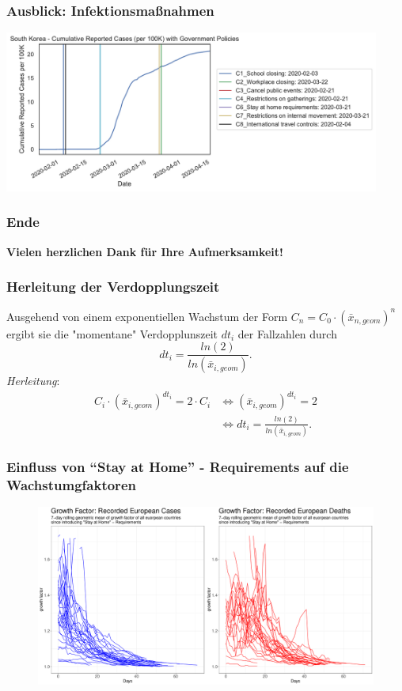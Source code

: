\documentclass{beamer}
\begin{document}
\begin{frame}
	\frametitle{Ausblick: Infektionsmaßnahmen}
	\centering
	\includegraphics[width = 350pt]{korea}
\end{frame}

\begin{frame}
	\frametitle{Ende}
		\centering
		\textbf{Vielen herzlichen Dank für Ihre Aufmerksamkeit!}
\end{frame}
 
\begin{frame}
	\frametitle{Herleitung der Verdopplungszeit}
	Ausgehend von einem exponentiellen Wachstum der Form $C_n = C_0 \cdot (\bar{x}_{n, geom})^{n}$ ergibt sie die "momentane" Verdopplunszeit $dt_i$ der Fallzahlen durch $$dt_i = \frac{ln(2)}{ln(\bar{x}_{i, geom})}.$$
	\emph{Herleitung}: 
	\begin{align*} C_i \cdot (\bar{x}_{i, geom})^{dt_i} = 2 \cdot C_i 
		 &\iff (\bar{x}_{i, geom})^{dt_i} = 2 \\
	 	&\iff dt_i = \frac{ln(2)}{ln(\bar{x}_{i, geom})}.
	\end{align*}
\end{frame}

\begin{frame}
 	\frametitle{Einfluss von ``Stay at Home'' - Requirements auf die Wachstumgfaktoren}
	\begin{figure}
		\centering
		\includegraphics[width = 350pt]{plot_c6_gf.pdf}
	\end{figure}
 \end{frame}
\end{document}
